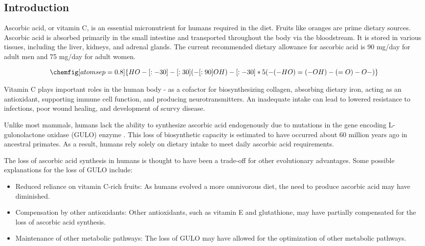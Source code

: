 \documentclass[]{report}
\begin{document}
\begin{multicols}{2}
\section{Introduction}
Ascorbic acid, or vitamin C, is an essential micronutrient for humans required in the diet. Fruits like oranges are prime dietary sources. Ascorbic acid is absorbed primarily in the small intestine and transported throughout the body via the bloodstream. It is stored in various tissues, including the liver, kidneys, and adrenal glands. The current recommended dietary allowance for ascorbic acid is 90 mg/day for adult men and 75 mg/day for adult women. 

$$\chemfig[atom sep = 0.8]{HO-[:-30]-[:30](-[:90]OH)-[:-30]*5(-(-HO)=(-OH)-(=O)-O-)}$$

Vitamin C plays important roles in the human body - as a cofactor for biosynthesizing collagen, absorbing dietary iron, acting as an antioxidant, supporting immune cell function, and producing neurotransmitters. An inadequate intake can lead to lowered resistance to infections, poor wound healing, and development of scurvy disease. 

Unlike most mammals, humans lack the ability to synthesize ascorbic acid endogenously due to mutations in the gene encoding L-gulonolactone oxidase (GULO) enzyme \cite{wikipedia}. This loss of biosynthetic capacity is estimated to have occurred about 60 million years ago in ancestral primates. As a result, humans rely solely on dietary intake to meet daily ascorbic acid requirements.

The loss of ascorbic acid synthesis in humans is thought to have been a trade-off for other evolutionary advantages. Some possible explanations for the loss of GULO include:

\begin{itemize}
    \item Reduced reliance on vitamin C-rich fruits: As humans evolved a more omnivorous diet, the need to produce ascorbic acid may have diminished.
    \item Compensation by other antioxidants: Other antioxidants, such as vitamin E and glutathione, may have partially compensated for the loss of ascorbic acid synthesis.
    \item Maintenance of other metabolic pathways: The loss of GULO may have allowed for the optimization of other metabolic pathways.
\end{itemize}


\end{multicols}
\end{document}
